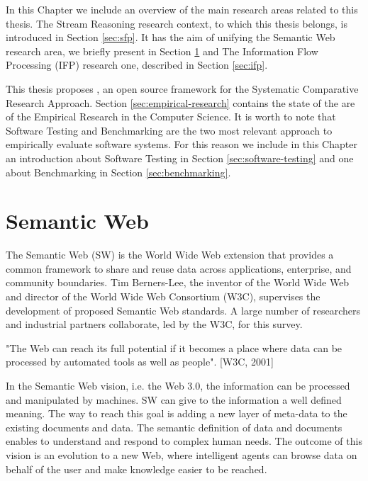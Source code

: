 In this Chapter we include an overview of the main research areas related to this thesis. The Stream Reasoning research context, to which this thesis belongs, is introduced in Section \ref{sec:sfp}. It has the aim of unifying the Semantic Web research area, we briefly present in Section \ref{sec:sw} and The Information Flow Processing (IFP) research one, described in Section \ref{sec:ifp}. 

This thesis proposes \namens, an open source framework for the Systematic Comparative Research Approach. Section \ref{sec:empirical-research} contains the state of the are of the Empirical Research in the Computer Science. It is worth to note that Software Testing and Benchmarking are the two most relevant approach to empirically evaluate software systems. For this reason we include in this Chapter an introduction about Software Testing in Section \ref{sec:software-testing} and one about Benchmarking in Section \ref{sec:benchmarking}.

\section{Semantic Web}\label{sec:sw}

The Semantic Web (SW) is the World Wide Web extension  that  provides a common framework to share and reuse data across applications, enterprise, and community boundaries. Tim Berners-Lee, the inventor of the World Wide Web and director of the World Wide Web Consortium (W3C), supervises the development of proposed Semantic Web standards. A large number of researchers and industrial partners collaborate, led by the W3C, for this survey.

"The Web can reach its full potential if it becomes a place where data can be processed by automated tools as well as people". [W3C, 2001]

In the Semantic Web vision, i.e. the Web 3.0,  the information can be processed and manipulated by machines. SW can give to the information a well defined meaning. The way to reach this goal is adding a new layer of meta-data to the existing documents and data. The semantic definition of data and documents enables to understand and respond to complex human needs. The outcome of this vision is an evolution to a new Web, where intelligent agents can browse data on behalf of the user and make knowledge easier to be reached.


